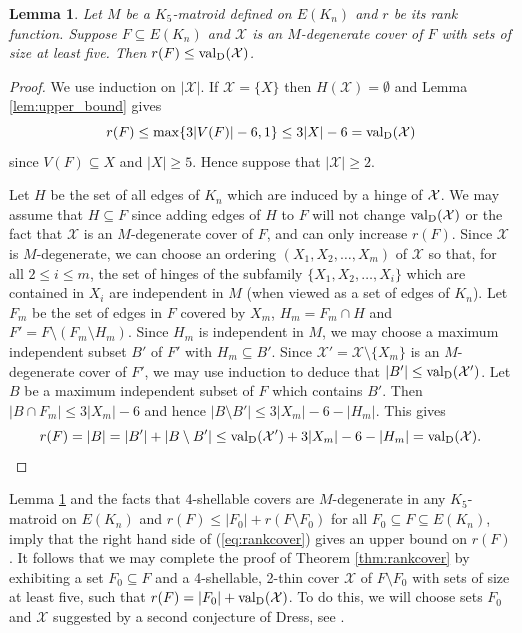 \documentclass{daj}
\newtheorem{lemma}[thm]{Lemma}\theoremstyle{plain}
\newcommand{\sm}{{\setminus}}
\newcommand{\MX}{{\mathcal X}}
\newcommand{\valD}{{\rm val}_{\rm D}}
\begin{document}
\begin{lemma}\label{lem:valupper}
Let $M$ be a $K_5$-matroid
defined on $E(K_n)$ and $r$ be its rank function.
Suppose $F\subseteq E(K_n)$ and $\MX$ is an  $M$-degenerate
cover of $F$  with sets of size at least five. Then $r(F)\leq \valD(\MX)$.
\end{lemma}
\begin{proof} We use induction on $|\MX|$.
If $\MX=\{X\}$ then $H(\MX)=\emptyset$ and Lemma \ref{lem:upper_bound} gives
$$r(F)\leq \max\{3|V(F)|-6,1\}\leq 3|X|-6=\valD(\MX)$$
since $V(F)\subseteq X$ and $|X|\geq 5$.
Hence suppose that $|\MX|\geq 2$.

Let  $H$ be the set of all edges of $K_n$ which are induced by a hinge of $\cal X$.
We may assume that $H\subseteq  F$  since adding edges of $H$ to $F$ will not change $\valD(\MX)$ or the fact that $\MX$ is an $M$-degenerate cover of $F$, and can only increase $r(F)$.
Since  $\MX$ is $M$-degenerate, we can choose an ordering
$(X_1,X_2,\ldots,X_m)$ of $\MX$ so that, for all $2\leq i\leq m$, the set of hinges of the subfamily $\{X_1,X_2,\ldots,X_{i}\}$ which are contained in $X_{i}$ are independent in $M$ (when viewed as a set of edges of $K_n$).
Let $F_m$ be the set of edges in $F$ covered by $X_m$, $H_m=F_m\cap H$ and
$F'=F\setminus (F_m\sm H_m)$. Since $H_m$ is independent in $M$, we may choose a maximum independent subset  $B'$ of $F'$  with $H_m\subseteq B'$.
Since $\MX'=\MX\setminus\{X_m\}$ is an $M$-degenerate
cover of $F'$, we may use induction to deduce that $|B'|\leq \valD(\MX')$.  Let $B$ be a maximum independent subset of $F$ which contains $B'$. Then $|B\cap F_m|\leq 3|X_m|-6$ and hence $|B\setminus B'|\leq 3|X_m|-6-|H_m|$.  This gives
$$r(F)=|B|= |B'|+|B\setminus B'|\leq \valD(\MX')+ 3|X_m|-6-|H_m|=\valD(\MX).$$
\end{proof}

Lemma \ref{lem:valupper} and
 the facts that 4-shellable covers are $M$-degenerate in any 
 $K_5$-matroid on $E(K_n)$ and  $r(F)\leq |F_0|+
r(F\setminus F_0)$  for all $F_0\subseteq F\subseteq E(K_n)$, imply that the right hand side of (\ref{eq:rankcover}) gives an upper bound on $r(F)$.  It follows that we may complete the proof of Theorem \ref{thm:rankcover} by exhibiting a set $F_0\subseteq F$ and a 4-shellable, 2-thin cover $\MX$ of $F\setminus F_0$ with sets of size at least five, such that $r(F)=|F_0|+\valD(\MX)$. To do this, 
we will choose sets $F_0$ and $\MX$ suggested by
a second conjecture  of 
Dress, 
see \cite{CDT,GSS93,T99}.
\end{document}
